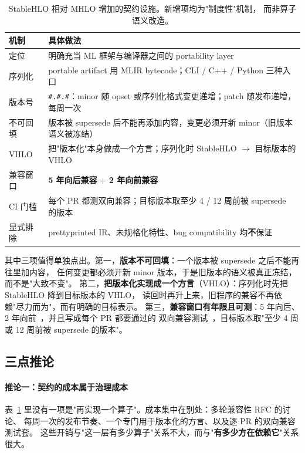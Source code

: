 \begin{table}[t]
  \caption{StableHLO 相对 MHLO 增加的契约设施。新增项均为"制度性"机制，
  而非算子语义改造。}
  \label{tab:contract}
  \small
  \begin{tabularx}{\linewidth}{@{}l X@{}}
    \toprule
    机制 & 具体做法 \\
    \midrule
    定位 & 明确充当 ML 框架与编译器之间的 portability layer \\
    序列化 & portable artifact 用 MLIR bytecode；CLI / C++ / Python 三种入口 \\
    版本号 & \texttt{\#.\#.\#}：minor 随 opset 或序列化格式变更递增；patch 随发布递增，每周一次 \\
    不可回填 & 版本被 supersede 后不能再添加内容，变更必须开新 minor（旧版本语义被冻结） \\
    VHLO & 把"版本化"本身做成一个方言；序列化时 StableHLO $\rightarrow$ 目标版本的 VHLO \\
    兼容窗口 & \textbf{5 年向后兼容} + \textbf{2 年向前兼容} \\
    CI 门槛 & 每个 PR 都测双向兼容；目标版本取至少 4 / 12 周前被 supersede 的版本 \\
    显式排除 & prettyprinted IR、未规格化特性、bug compatibility 均\textbf{不}保证 \\
    \bottomrule
  \end{tabularx}
\end{table}

其中三项值得单独点出。第一，\textbf{版本不可回填}：一个版本被 supersede 之后不能再往里加内容，
任何变更都必须开新 minor 版本，于是旧版本的语义被真正冻结，而不是"大致不变"。
第二，\textbf{把版本化实现成一个方言}（VHLO）：序列化时先把 StableHLO 降到目标版本的 VHLO，
读回时再升上来，旧程序的兼容不再依赖"尽力而为"，而有明确的目标表示。
第三，\textbf{兼容窗口有年限且可测}：5 年向后、2 年向前~\cite{stablehlorfccompat,stablehlorfcv1compat}，并且写成每个 PR 都要通过的
双向兼容测试~\cite{stablehlocompat,stablehlorfcfwd}，目标版本取"至少 4 周或 12 周前被 supersede 的版本"。

\subsection{三点推论}

\paragraph{推论一：契约的成本属于治理成本}
表~\ref{tab:contract} 里没有一项是"再实现一个算子"。成本集中在别处：多轮兼容性 RFC 的讨论、
每周一次的发布节奏、一个专门用于版本化的方言、以及逐 PR 的双向兼容测试套。
这些开销与"这一层有多少算子"关系不大，而与"\textbf{有多少方在依赖它}"关系很大。

